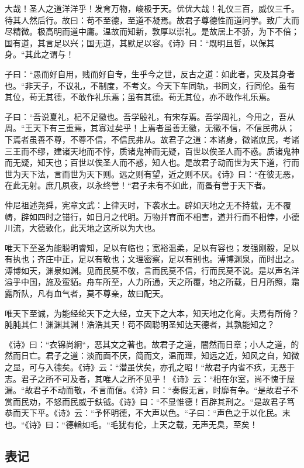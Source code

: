 \documentclass[]{article}
\begin{document}
大哉！圣人之道洋洋乎！发育万物，峻极于天。优优大哉！礼仪三百，威仪三千。待其人然后行。故曰：苟不至德，至道不凝焉。故君子尊德性而道问学。致广大而尽精微。极高明而道中庸。温故而知新，敦厚以崇礼。是故居上不骄，为下不倍；国有道，其言足以兴；国无道，其默足以容。《诗》曰：``既明且哲，以保其身。``其此之谓与！

子曰：``愚而好自用，贱而好自专，生乎今之世，反古之道：如此者，灾及其身者也。``非天子，不议礼，不制度，不考文。今天下车同轨，书同文，行同伦。虽有其位，苟无其德，不敢作礼乐焉；虽有其德。苟无其位，亦不敢作礼乐焉。

子曰：``吾说夏礼，杞不足徵也。吾学殷礼，有宋存焉。吾学周礼，今用之，吾从周。``王天下有三重焉，其寡过矣乎！上焉者虽善无徵，无徵不信，不信民弗从；下焉者虽善不尊，不尊不信，不信民弗从。故君子之道：本诸身，徵诸庶民，考诸三王而不缪，建诸天地而不悖，质诸鬼神而无疑，百世以俟圣人而不惑。质诸鬼神而无疑，知天也；百世以俟圣人而不惑，知人也。是故君子动而世为天下道，行而世为天下法，言而世为天下则。远之则有望，近之则不厌。《诗》曰：``在彼无恶，在此无射。庶几夙夜，以永终誉！``君子未有不如此，而蚤有誉于天下者。

仲尼祖述尧舜，宪章文武：上律天时，下袭水土。辟如天地之无不持载，无不覆帱，辟如四时之错行，如日月之代明。万物并育而不相害，道并行而不相悖，小德川流，大德敦化，此天地之这所以为大也。

唯天下至圣为能聪明睿知，足以有临也；宽裕温柔，足以有容也；发强刚毅，足以有执也；齐庄中正，足以有敬也；文理密察，足以有别也。溥博渊泉，而时出之。溥博如天，渊泉如渊。见而民莫不敬，言而民莫不信，行而民莫不说。是以声名洋溢乎中国，施及蛮貊。舟车所至，人力所通，天之所覆，地之所载，日月所照，霜露所队，凡有血气者，莫不尊亲，故曰配天。

唯天下至诚，为能经纶天下之大经，立天下之大本，知天地之化育。夫焉有所倚？肫肫其仁！渊渊其渊！浩浩其天！苟不固聪明圣知达天德者，其孰能知之？

《诗》曰：``衣锦尚絅``，恶其文之著也。故君子之道，闇然而日章；小人之道，的然而日亡。君子之道：淡而面不厌，简而文，温而理，知远之近，知风之自，知微之显，可与入德矣。《诗》云：``潜虽伏矣，亦孔之昭！``故君子内省不疚，无恶于志。君子之所不可及者，其唯人之所不见乎！《诗》云：``相在尔室，尚不愧于屋漏。``故君子不动而敬，不言而信。《诗》曰：``奏假无言，时靡有争。``是故君子不赏而民劝，不怒而民威于鈇钺。《诗》曰：``不显惟德！百辟其刑之。``是故君子笃恭而天下平。《诗》云：``予怀明德，不大声以色。``子曰：``声色之于以化民。末也。``《诗》曰：``德輶如毛。``毛犹有伦，上天之载，无声无臭，至矣！

\hypertarget{header-n744}{%
\subsection{表记}\label{header-n744}}
\end{document}
